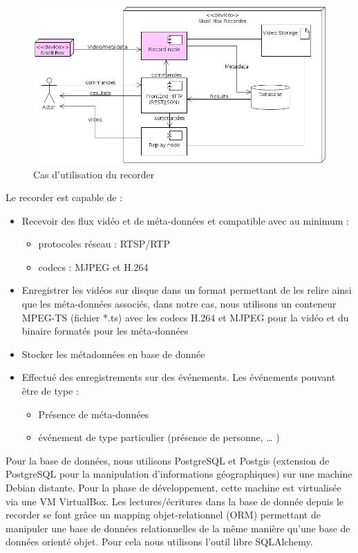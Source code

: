 \begin{figure}[!h]
  \centering
  \includegraphics[scale=0.5]{figures/sisell_box_recorder}
  \caption{Cas d'utilisation du recorder}
\end{figure}

Le recorder est capable de :
\begin{itemize}
\item Recevoir des flux vidéo et de méta-données et compatible avec au minimum :
    \begin{itemize}[label=$\bullet$]
      \item  protocoles réseau : RTSP/RTP
      \item  codecs : MJPEG et H.264
    \end{itemize}
\item Enregistrer les vidéos sur disque dans un format permettant de les relire ainsi que les méta-données associés, dans notre cas, nous utilisons un conteneur MPEG-TS (fichier *.ts) avec les codecs H.264 et MJPEG pour la vidéo et du binaire formatés pour les méta-données
\item Stocker les métadonnées en base de donnée
\item Effectué des enregistrements sur des événements. Les événements pouvant être de type :
  \begin{itemize}[label=$\bullet$]
      \item Présence de méta-données
      \item  événement de type particulier (présence de personne, … )\\
  \end{itemize}
\end{itemize}

Pour la base de données, nous utilisons PostgreSQL et Postgis (extension de PostgreSQL pour la manipulation d'informations géographiques) sur une machine Debian distante. Pour la phase de développement, cette machine est virtualisée via une VM VirtualBox.
Les lectures/écritures dans la base de donnée depuis le recorder se font grâce un mapping objet-relationnel (ORM) permettant de manipuler une base de données relationnelles de la même manière qu'une base de données orienté objet. Pour cela nous utilisons l'outil libre SQLAlchemy.



